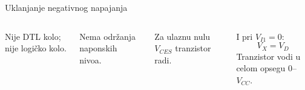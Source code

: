 \begin{frame}[label=10-s044]{Uklanjanje negativnog napajanja}
\setlength{\abovedisplayskip}{4pt}\setlength{\belowdisplayskip}{4pt}\setlength{\abovedisplayshortskip}{3pt}\setlength{\belowdisplayshortskip}{3pt}
\begin{columns}[T,onlytextwidth]\centering \raggedright
\textcolor{DEcrvena}{Nije DTL kolo; nije logičko kolo.}\par\bigskip
Nema održanja naponskih nivoa.\par
Za ulaznu nulu $V_{CES}$ tranzistor radi.\par\bigskip
I pri $V_{I1}=0$:
\[V_X=V_D\]
Tranzistor vodi u celom opsegu $0$–$V_{CC}$.\end{columns}
\end{frame}
